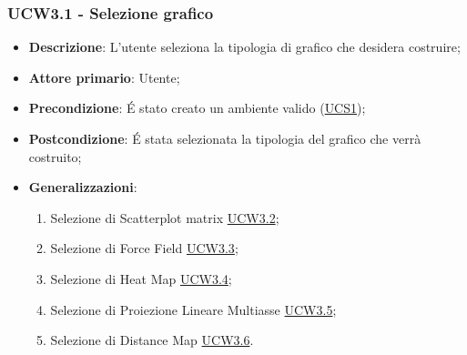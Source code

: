 \subsubsection{UCW3.1 - Selezione grafico}
\label{ssub:ucW3.1}
\begin{itemize}

	\item \textbf{Descrizione}: L’utente seleziona la tipologia di grafico che desidera costruire;

	\item \textbf{Attore primario}: Utente;

	\item \textbf{Precondizione}:   É stato creato un ambiente valido (\hyperref[sub:ucs1]{UCS1});

	\item \textbf{Postcondizione}:  É stata selezionata la tipologia del grafico che verrà costruito;

	\item \textbf{Generalizzazioni}:
	      \begin{enumerate}

		      \item Selezione di Scatterplot matrix \hyperref[ssub:ucw3.2]{UCW3.2};
		      \item Selezione di Force Field \hyperref[ssub:ucw3.3]{UCW3.3};
		      \item Selezione di Heat Map \hyperref[ssub:ucw3.4]{UCW3.4};
		      \item Selezione di Proiezione Lineare Multiasse \hyperref[ssub:ucw3.5]{UCW3.5};
		      \item Selezione di Distance Map \hyperref[ssub:ucw3.6]{UCW3.6}.

	      \end{enumerate}

\end{itemize}


